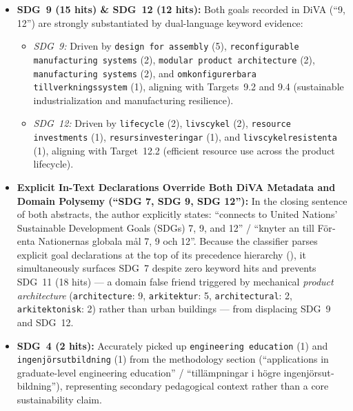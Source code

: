 \begin{casestudySection}
\begin{itemize}
    \item \textbf{\gls{SDG}~9 (15 hits) \& \gls{SDG}~12 (12 hits):} Both goals recorded in \gls{DiVA} (\enquote{9, 12}) are strongly substantiated by dual-language keyword evidence:
    \begin{itemize}
        \item \emph{\gls{SDG}~9:} Driven by \texttt{design for assembly} (5), \texttt{reconfigurable manufacturing systems} (2), \texttt{modular product architecture} (2), \texttt{manufacturing systems} (2), and \texttt{\foreignlanguage{swedish}{omkonfigurerbara tillverkningssystem}} (1), aligning with Targets~9.2 and 9.4 (sustainable industrialization and manufacturing resilience).
        \item \emph{\gls{SDG}~12:} Driven by \texttt{lifecycle} (2), \texttt{\foreignlanguage{swedish}{livscykel}} (2), \texttt{resource investments} (1), \texttt{\foreignlanguage{swedish}{resursinvesteringar}} (1), and \texttt{\foreignlanguage{swedish}{livscykelresistenta}} (1), aligning with Target~12.2 (efficient resource use across the product lifecycle).
    \end{itemize}

    \item \textbf{Explicit In-Text Declarations Override Both \gls{DiVA} Metadata and Domain Polysemy (\enquote{SDG 7, SDG 9, SDG 12}):} In the closing sentence of both abstracts, the author explicitly states: \enquote{connects to United Nations’ Sustainable Development Goals (SDGs) 7, 9, and 12} / \enquote{\foreignlanguage{swedish}{knyter an till Förenta Nationernas globala mål 7, 9 och 12}}. Because the classifier parses explicit goal declarations at the top of its precedence hierarchy (), it simultaneously surfaces \gls{SDG}~7 despite zero keyword hits and prevents \gls{SDG}~11 (18 hits) --- a domain false friend triggered by mechanical \emph{product architecture} (\texttt{architecture}: 9, \texttt{\foreignlanguage{swedish}{arkitektur}}: 5, \texttt{architectural}: 2, \texttt{\foreignlanguage{swedish}{arkitektonisk}}: 2) rather than urban buildings --- from displacing \gls{SDG}~9 and \gls{SDG}~12.

    \item \textbf{\gls{SDG}~4 (2 hits):} Accurately picked up \texttt{engineering education} (1) and \texttt{\foreignlanguage{swedish}{ingenjörsutbildning}} (1) from the methodology section (\enquote{applications in graduate-level engineering education} / \enquote{\foreignlanguage{swedish}{tillämpningar i högre ingenjörsutbildning}}), representing secondary pedagogical context rather than a core sustainability claim.
\end{itemize}



\end{casestudySection}
